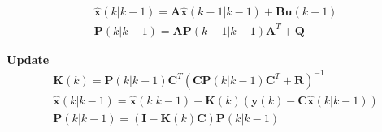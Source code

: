 \begin{align}
	&\hat{\textbf{x}}	(k|k-1) = \textbf{A} \hat{\textbf{x}}	(k-1|k-1) + \textbf{B}\textbf{u}	(k-1)  		\label{eq:Kalman_pred_state_compact} 	\\
	&\textbf{P}			(k|k-1) = \textbf{A}\textbf{P}			(k-1|k-1)\textbf{A}^T+\textbf{Q} 				\label{eq:Kalman_pred_cov_compact} 		
\end{align}

\textbf{Update}
\begin{align}
	&\textbf{K}			(k) 		= \textbf{P}				(k|k-1)\textbf{C}^T(\textbf{C}\textbf{P}	(k|k-1)	\textbf{C}^T + \textbf{R})^{-1}										\label{eq:Kalman_upd_kalman_gain_compact} \\
	&\hat{\textbf{x}}	(k|k-1) 	= \hat{\textbf{x}}			(k|k-1) + \textbf{K}						(k)	(\textbf{y}		(k) - \textbf{C}\hat{\textbf{x}}		(k|k-1)) 	\label{eq:Kalman_upd_est_state_compact} \\
	&\textbf{P}			(k|k-1) 	= (\textbf{I} - \textbf{K}	(k)\textbf{C})\textbf{P}					(k|k-1)																		\label{eq:Kalman_upd_est_cov_compact}
\end{align}

